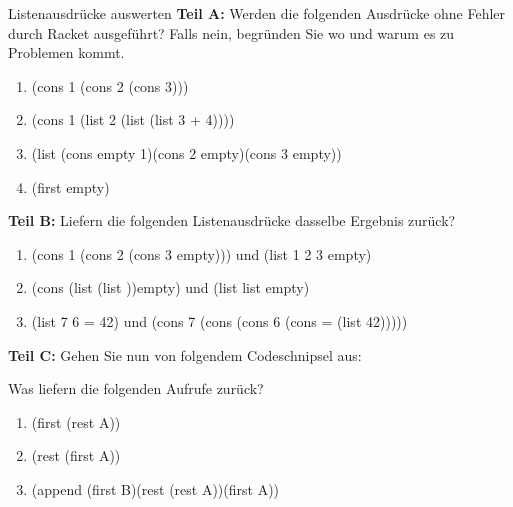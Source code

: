 \documentclass{../preamble}
\begin{document}
\begin{task}[credit = \stars{1}{3}]{Listenausdrücke auswerten}
	{\large\textbf{Teil A:}} Werden die folgenden Ausdrücke ohne Fehler durch Racket ausgeführt? Falls nein, begründen Sie wo und warum es zu Problemen kommt.
	\begin{enumerate}
		\item (\textcolor{keywordcolor}{cons} 1 (\textcolor{keywordcolor}{cons} 2 (\textcolor{keywordcolor}{cons} 3)))
		\item (\textcolor{keywordcolor}{cons} 1 (\textcolor{keywordcolor}{list} 2 (\textcolor{keywordcolor}{list} (\textcolor{keywordcolor}{list} 3 + 4))))
		\item (\textcolor{keywordcolor}{list} (\textcolor{keywordcolor}{cons} \textcolor{keywordcolor}{empty} 1)(\textcolor{keywordcolor}{cons} 2 \textcolor{keywordcolor}{empty})(\textcolor{keywordcolor}{cons} 3 \textcolor{keywordcolor}{empty}))
		\item (\textcolor{keywordcolor}{first} \textcolor{keywordcolor}{empty})
	\end{enumerate}
	{\large\textbf{Teil B:}} Liefern die folgenden Listenausdrücke dasselbe Ergebnis zurück?
	\begin{enumerate}
		\item (\textcolor{keywordcolor}{cons} 1 (\textcolor{keywordcolor}{cons} 2 (\textcolor{keywordcolor}{cons} 3 \textcolor{keywordcolor}{empty}))) und (\textcolor{keywordcolor}{list} 1 2 3 \textcolor{keywordcolor}{empty})
		\item (\textcolor{keywordcolor}{cons} (\textcolor{keywordcolor}{list} \grqq(\textcolor{keywordcolor}{list} )\grqq)\textcolor{keywordcolor}{empty}) und (\textcolor{keywordcolor}{list} \grqq\textcolor{keywordcolor}{list}\grqq{} \textcolor{keywordcolor}{empty})
		\item (\textcolor{keywordcolor}{list} 7 \grqq *\grqq{} 6 \grqq =\grqq{} 42) und (\textcolor{keywordcolor}{cons} 7 (\textcolor{keywordcolor}{cons} \grqq *\grqq{} (\textcolor{keywordcolor}{cons} 6 (\textcolor{keywordcolor}{cons} \grqq =\grqq{} (\textcolor{keywordcolor}{list} 42)))))
	\end{enumerate}
	{\large\textbf{Teil C:}} Gehen Sie nun von folgendem Codeschnipsel aus:
	
	Was liefern die folgenden Aufrufe zurück?
	\begin{enumerate}
		\item (\textcolor{keywordcolor}{first} (\textcolor{keywordcolor}{rest} A))
		\item (\textcolor{keywordcolor}{rest} (\textcolor{keywordcolor}{first} A))
		\item (\textcolor{keywordcolor}{append} (\textcolor{keywordcolor}{first} B)(\textcolor{keywordcolor}{rest} (\textcolor{keywordcolor}{rest} A))(\textcolor{keywordcolor}{first} A))
	\end{enumerate}


\end{task}
\end{document}
